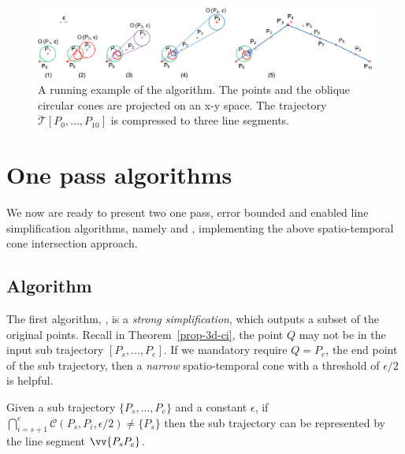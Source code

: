 
\begin{figure}[tb!]
\centering
\includegraphics[scale=0.8]{figures/Fig-conesta.png}
\vspace{-1ex}
\caption{\small A running example of the \cista algorithm. The points and the oblique circular cones are projected on an x-y space. The trajectory $\dddot{\mathcal{T}}[P_0, \ldots, P_{10}]$ is compressed to three line segments.}
\vspace{-2ex}
\label{fig:exm-consta}
\end{figure}


\section{One pass algorithms}
We now are ready to present two one pass, error bounded and \sed enabled line simplification algorithms, namely \cist and \cista, implementing the above spatio-temporal cone intersection approach.






\subsection{{Algorithm \cist}}
The first algorithm, \cist, is a \emph{strong simplification}\cite{Trajcevski:DDR}, which outputs a subset of the original points.
Recall in Theorem~\ref{prop-3d-ci}, the point $Q$ may not be in the input sub trajectory $[P_s,...,P_e]$.
If we mandatory require $Q=P_e$, the end point of the sub trajectory, then a \emph{narrow} spatio-temporal cone with a threshold of $\epsilon/2$ is helpful.

\begin{theorem}
\label{prop-3d-ci-half}
Given a sub trajectory $\{P_s, \ldots, P_e\}$ and a constant $\epsilon$, if $\bigcap_{i=s+1}^{e}{\mathcal{C}(P_s, P_i, \epsilon/2)} \ne \{P_s\}$ then the sub trajectory can be represented by the line segment $\vv{P_sP_e}$.
\end{theorem}

